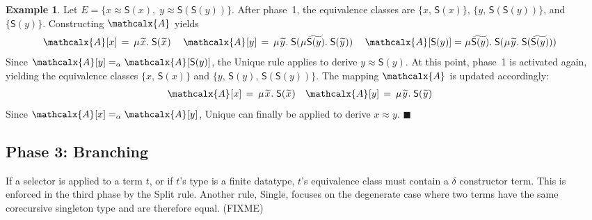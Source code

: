 \documentclass[letter]{article}
\newcommand\MU{\vvthinspace\mu\vvthinspace}
\theoremstyle{definition}
\newtheorem{examplex}{Example}%
\newcommand\const[1]{\textsf{#1}}
\newcommand\xend{{\hfill$\scriptstyle\blacksquare$}}
\newcommand{\Ec}{E}
\newcommand{\tEc}{\Terms(\Ec)}
\newcommand{\rn}[1]{\textsf{#1}}
\newcommand{\teq}{\approx}
\newcommand{\ec}[1]{[#1]}
\newcommand{\Val}{\mathcalx{A}\vvthinspace}
\newcommand{\Varec}[1]{\vvthinspace\widetilde{#1}\vvthinspace}
\newcommand{\VAREC}[1]{\widetilde{\vphantom{\scriptstyle x^i}\smash{#1}}}
\newcommand{\aequiv}{\mathrel{=_\alpha}}
\newcommand\Terms{\mathcalx{T}}
\newcommand\vvthinspace{\kern+0.041667em}
\begin{document}

\begin{examplex}
Let $\Ec = \{ x \teq \const{S}(x),\; y \teq \const{S}(\const{S}(y)) \}$.
After phase~1, the equivalence classes %
are
$\{ x,\, \const{S}(x) \}$,
$\{ y,\, \const{S}(\const{S}(y)) \}$,
and $\{ \const{S}(y) \}$.
Constructing $\Val$ yields
\begin{align*}
\Val \ec{x} & \,=\, \MU {\Varec{x}}.\; \const{S}(\Varec{x}) &
\kern0.25em %
\Val \ec{y} & \,=\,
\MU {\Varec{y}}.\; \const{S}(\smash{\MU {\VAREC{\const{S}(y)}}}.\; \const{S}( {\Varec{y}} ) )
\kern0.25em %
 &
\Val \ec{\const{S}(y)} & =
\MU {\VAREC{\const{S}(y)}}.\; \const{S}(\MU {\Varec{y}}.\; \const{S}( {\VAREC{\const{S}(y)}} ) )
\end{align*}
Since $\Val \ec{y} \aequiv \Val \ec{\const{S}(y)}$,
the \rn{Unique} rule applies to derive $y \teq \const{S}(y)$.
%
At this point, phase~1 is activated again, %
yielding the equivalence classes
$\{ x,\, \const{S}(x) \}$ and
$\{ y,\, \const{S}(y),\allowbreak\, \const{S}(\const{S}(y)) \}$.
The mapping $\Val$ is updated accordingly:
\begin{align*}
\Val \ec{x} & \,=\, \MU {\Varec{x}}.\; \const{S}(\Varec{x})
&
\Val \ec{y} & \,=\, \MU {\Varec{y}}.\; \const{S}({\Varec{y}})
\end{align*}
Since $\Val \ec{x} \aequiv \Val \ec{y}$,
\rn{Unique} can finally be applied to derive $x \teq y$.
\xend
\end{examplex}

\subsection{Phase 3: Branching}

If a selector is applied to a term $t$, or if $t$'s type is a finite datatype,
$t$'s equivalence class must contain a
$\delta$ constructor term.
This is enforced in the third phase by the \rn{Split} rule.
Another rule, \rn{Single}, focuses on the degenerate case where two
terms %
have the same corecursive singleton type
and are therefore equal.
(FIXME)
\end{document}
